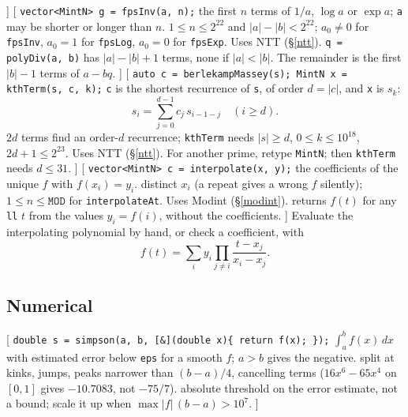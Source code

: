 ]\label{sos}
[
	 \texttt{vector<MintN> g = fpsInv(a, n);}
	 the first $n$ terms of $1/a$, $\log a$ or $\exp a$; \texttt{a} may be shorter or longer than $n$.
	 $1 \le n \le 2^{22}$ and $|a| - |b| < 2^{22}$; $a_0 \ne 0$ for \texttt{fpsInv}, $a_0 = 1$ for \texttt{fpsLog}, $a_0 = 0$ for \texttt{fpsExp}. Uses NTT (\S\ref{ntt}).
	 \texttt{q = polyDiv(a, b)} has $|a| - |b| + 1$ terms, none if $|a| < |b|$. The remainder is the first $|b| - 1$ terms of $a - bq$.
]\label{fps}
[
	 \texttt{auto c = berlekampMassey(s); MintN x = kthTerm(s, c, k);}
	 \texttt{c} is the shortest recurrence of \texttt{s}, of order $d = |c|$, and \texttt{x} is $s_k$:
	\[ s_i = \sum_{j=0}^{d-1} c_j \, s_{i-1-j} \quad (i \ge d). \]
	 $2d$ terms find an order-$d$ recurrence; \texttt{kthTerm} needs $|s| \ge d$, $0 \le k \le 10^{18}$, $2d + 1 \le 2^{23}$. Uses NTT (\S\ref{ntt}).
	 For another prime, retype \texttt{MintN}; then \texttt{kthTerm} needs $d \le 31$.
]\label{linearrec}
[
	 \texttt{vector<MintN> c = interpolate(x, y);}
	 the coefficients of the unique $f$ with $f(x_i) = y_i$.
	 distinct $x_i$ (a repeat gives a wrong $f$ silently); $1 \le n \le \texttt{MOD}$ for \texttt{interpolateAt}. Uses Modint (\S\ref{modint}).
	 returns $f(t)$ for any \texttt{ll} $t$ from the values $y_i = f(i)$, without the coefficients.
]\label{lagrange}
{\footnotesize\tightdisplay
{}
Evaluate the interpolating polynomial by hand, or check a coefficient, with
\[ f(t) = \sum_i y_i \prod_{j \ne i} \frac{t - x_j}{x_i - x_j}. \]
}

\subsection{Numerical}
[
	 \texttt{double s = simpson(a, b, [\&](double x)\{ return f(x); \});}
	 $\int_a^b f(x)\,dx$ with estimated error below \texttt{eps} for a smooth $f$; $a > b$ gives the negative.
	 split at kinks, jumps, peaks narrower than $(b - a) / 4$, cancelling terms ($16x^6 - 65x^4$ on $[0, 1]$ gives $-10.7083$, not $-75/7$).
	 absolute threshold on the error estimate, not a bound; scale it up when $\max |f|\,(b - a) > 10^7$.
]\label{simpson}
